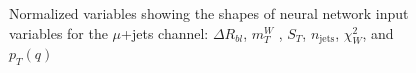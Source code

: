 \begin{figure}[h!]
\vspace{-4.5mm}
\hfil
{}
\caption{Normalized variables showing the shapes of neural network input variables for the $\mu$+jets channel: $\Delta R_{b l}$, $m_{T}^{W}$ , $S_T$, $n_{\text{jets}}$, $\chi^{2}_{W}$, and $p_T (q)$}
\label{fig:VarPlots2}
\end{figure}

